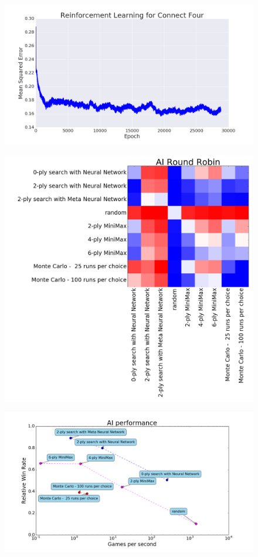 \begin{frame}
\begin{figure}
\includegraphics[width=1 \textwidth]{reinforcement_c4}
\end{figure}
\end{frame}

\begin{frame}
\begin{figure}
\includegraphics[width=0.70 \textwidth]{round_robin}
\end{figure}
\end{frame}

\begin{frame}
\begin{figure}
\includegraphics[width=1.0 \textwidth]{performance}
\end{figure}
\end{frame}

